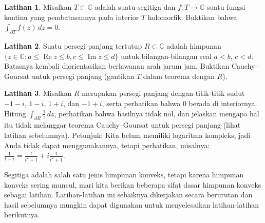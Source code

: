 \documentclass[12pt,openany]{book}
\renewcommand{\Re}{\operatorname{Re}}
\renewcommand{\Im}{\operatorname{Im}}
\newcommand{\C}{{\mathbb{C}}}
\theoremstyle{plain}
\theoremstyle{remark}
\theoremstyle{definition}
\newenvironment{exbox}{%
    \def\FrameCommand{\vrule width 1pt \relax\hspace{10pt}}%
    \MakeFramed{\advance\hsize-\width\FrameRestore}%
}{%
    \endMakeFramed
}
\theoremstyle{exercise}
\newtheorem{exercise}{Latihan}[section]
\theoremstyle{example}
\begin{document}
\begin{exbox}
\begin{exercise}
Misalkan $T \subset \C$ adalah suatu segitiga dan $f \colon T \to \C$ suatu
fungsi kontinu yang pembatasannya pada interior $T$ holomorfik.
Buktikan bahwa $\int_{\partial T} f(z) \, dz = 0$.
\end{exercise}

\begin{exercise}
Suatu persegi panjang tertutup $R \subset \C$ adalah himpunan
$\bigl\{ z \in \C : a \leq \Re z \leq b , c \leq \Im z \leq d \bigr\}$
untuk bilangan-bilangan real $a < b$, $c < d$.  Batasnya
kembali diorientasikan berlawanan arah jarum jam.  Buktikan Cauchy--Goursat untuk persegi panjang
(gantikan $T$ dalam teorema dengan $R$).
\end{exercise}

\begin{exercise}
Misalkan $R$ merupakan persegi panjang dengan titik-titik sudut
$-1-i$, $1-i$, $1+i$, dan $-1+i$, serta perhatikan bahwa $0$ berada di interiornya.
Hitung $\int_{\partial R} \frac{1}{z} \, dz$,
perhatikan bahwa hasilnya tidak nol, dan jelaskan mengapa hal itu tidak melanggar
teorema Cauchy--Goursat untuk persegi panjang (lihat latihan sebelumnya).
Petunjuk: Kita belum memiliki logaritma kompleks, jadi Anda tidak dapat menggunakannya,
tetapi perhatikan, misalnya:
$\frac{1}{t-i} = \frac{t}{t^2+1} + i \frac{1}{t^2+1}$.
\end{exercise}
\end{exbox}

Segitiga adalah salah satu jenis himpunan konveks, tetapi karena himpunan konveks sering
muncul, mari kita berikan beberapa sifat dasar himpunan konveks sebagai latihan.
Latihan-latihan ini sebaiknya dikerjakan secara berurutan dan hasil sebelumnya mungkin dapat digunakan untuk menyelesaikan
latihan-latihan berikutnya.
\end{document}
